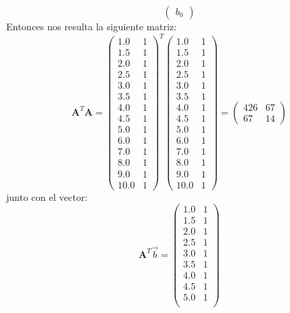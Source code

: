 \documentclass[11pt]{article}
\theoremstyle{definition}
\begin{document}
\begin{enumerate}[(i)]
\begin{equation*}
\begin{pmatrix}
b_{0}
\end{pmatrix}
\end{equation*}
Entonces nos resulta la siguiente matriz:
\begin{equation*}
\textbf{A}^{T}\textbf{A} =
\begin{pmatrix}
1.0 & 1\\
1.5 & 1\\
2.0 & 1\\
2.5 & 1\\
3.0 & 1\\
3.5 & 1\\
4.0 & 1\\
4.5 & 1\\
5.0 & 1\\
6.0 & 1\\
7.0 & 1\\
8.0 & 1\\
9.0 & 1\\
10.0 & 1
\end{pmatrix}^{T}
\begin{pmatrix}
1.0 & 1\\
1.5 & 1\\
2.0 & 1\\
2.5 & 1\\
3.0 & 1\\
3.5 & 1\\
4.0 & 1\\
4.5 & 1\\
5.0 & 1\\
6.0 & 1\\
7.0 & 1\\
8.0 & 1\\
9.0 & 1\\
10.0 & 1
\end{pmatrix} =
\begin{pmatrix}
426 & 67\\
67 & 14
\end{pmatrix}
\end{equation*}
junto con el vector:
\begin{equation*}
\textbf{A}^{T}\vec{b} =
\begin{pmatrix}
1.0 & 1\\
1.5 & 1\\
2.0 & 1\\
2.5 & 1\\
3.0 & 1\\
3.5 & 1\\
4.0 & 1\\
4.5 & 1\\
5.0 & 1\\

\end{pmatrix}
\end{equation*}
\end{enumerate}
\end{document}
